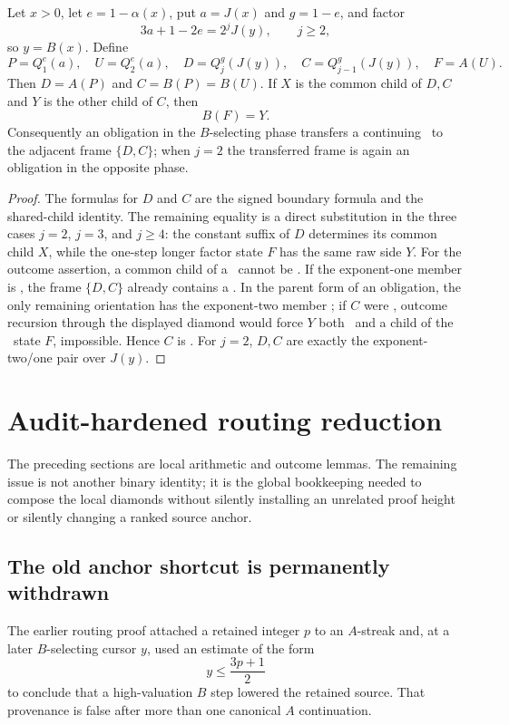 \begin{lemma}\label{lem:b-diamond}
Let $x>0$, let $e=1-\alpha(x)$, put $a=J(x)$ and $g=1-e$, and factor
\[
  3a+1-2e=2^jJ(y),\qquad j\ge2,
\]
so $y=B(x)$. Define
\[
 P=Q_1^e(a),\quad U=Q_2^e(a),\quad
 D=Q_j^g(J(y)),\quad C=Q_{j-1}^g(J(y)),\quad F=A(U).
\]
Then $D=A(P)$ and $C=B(P)=B(U)$. If $X$ is the common child of $D,C$ and
$Y$ is the other child of $C$, then
\[
  B(F)=Y.
\]
Consequently an obligation in the $B$-selecting phase transfers a continuing
\DRAW\ to the adjacent frame $\{D,C\}$; when $j=2$ the transferred frame is
again an obligation in the opposite phase.
\end{lemma}

\begin{proof}
The formulas for $D$ and $C$ are the signed boundary formula and the
shared-child identity. The remaining equality is a direct substitution in the
three cases $j=2$, $j=3$, and $j\ge4$: the constant suffix of $D$ determines
its common child $X$, while the one-step longer factor state $F$ has the same
raw side $Y$. For the outcome assertion, a common child of a \DRAW\ cannot be
\LOSS. If the exponent-one member is \DRAW, the frame $\{D,C\}$ already
contains a \DRAW. In the parent form of an obligation, the only remaining
orientation has the exponent-two member \DRAW; if $C$ were \WIN, outcome
recursion through the displayed diamond would force $Y$ both \LOSS\ and a
child of the \DRAW\ state $F$, impossible. Hence $C$ is \DRAW. For $j=2$,
$D,C$ are exactly the exponent-two/one pair over $J(y)$.
\end{proof}


\section{Audit-hardened routing reduction}\label{sec:routing}

The preceding sections are local arithmetic and outcome lemmas.  The remaining
issue is not another binary identity; it is the global bookkeeping needed to
compose the local diamonds without silently installing an unrelated proof
height or silently changing a ranked source anchor.

\subsection{The old anchor shortcut is permanently withdrawn}

The earlier routing proof attached a retained integer $p$ to an $A$-streak and,
at a later $B$-selecting cursor $y$, used an estimate of the form
\[
 y\le \frac{3p+1}{2}
\]
to conclude that a high-valuation $B$ step lowered the retained source.  That
provenance is false after more than one canonical $A$ continuation.

